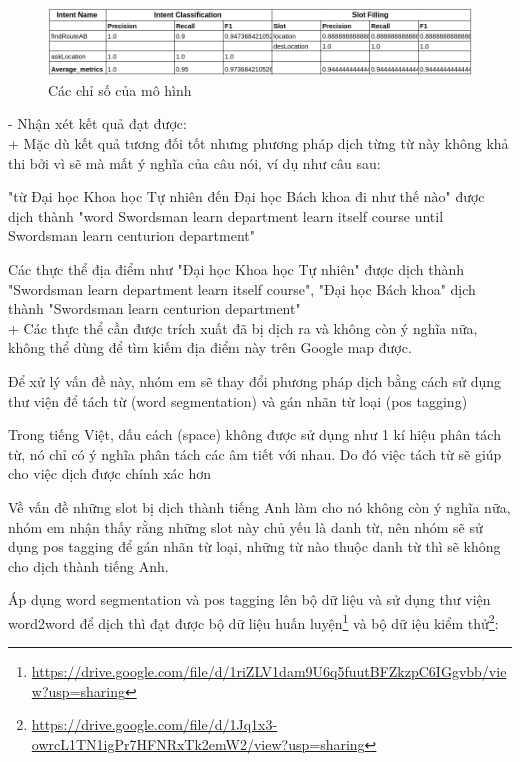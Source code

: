    \begin{figure}[htp]
              \centering
              \includegraphics[width=15cm]{images/metrics-dich-tung-t.png} 
              \caption{Các chỉ số của mô hình}
              \label{fig:sodohethongchiduong}

          \end{figure} 
          
	- Nhận xét kết quả đạt được:
	\\
	+ Mặc dù kết quả tương đối tốt nhưng phương pháp dịch từng từ này không khả thi bởi vì sẽ mà mất ý nghĩa của câu nói, ví dụ như câu sau: 

"từ Đại học Khoa học Tự nhiên đến Đại học Bách khoa đi như thế nào" được dịch thành "word Swordsman learn department learn itself course until Swordsman learn centurion department"

Các thực thể địa điểm như "Đại học Khoa học Tự nhiên" được dịch thành "Swordsman learn department learn itself course", "Đại học Bách khoa" dịch thành "Swordsman learn centurion department"
\\
	+ Các thực thể cần được trích xuất đã bị dịch ra và không còn ý nghĩa nữa, không thể dùng để tìm kiếm địa điểm này trên Google map được.

	Để xử lý vấn đề này, nhóm em sẽ thay đổi phương pháp dịch bằng cách sử dụng thư viện để tách từ (word segmentation) và gán nhãn từ loại (pos tagging)

Trong tiếng Việt, dấu cách (space) không được sử dụng như 1 kí hiệu phân tách từ, nó chỉ có ý nghĩa phân tách các âm tiết với nhau. Do đó việc tách từ sẽ giúp cho việc dịch được chính xác hơn

Về vấn đề những slot bị dịch thành tiếng Anh làm cho nó không còn ý nghĩa nữa, nhóm em nhận thấy rằng những slot này chủ yếu là danh từ, nên nhóm sẽ sử dụng pos tagging để gán nhãn từ loại, những từ nào thuộc danh từ thì sẽ không cho dịch thành tiếng Anh.

Áp dụng word segmentation và pos tagging lên bộ dữ liệu và sử dụng thư viện word2word để dịch thì đạt được bộ dữ liệu huấn luyện\footnote{\url{https://drive.google.com/file/d/1riZLV1dam9U6q5fuutBFZkzpC6IGgvbb/view?usp=sharing}} và bộ dữ iệu kiểm thử\footnote{	\url{https://drive.google.com/file/d/1Jq1x3-owrcL1TN1igPr7HFNRxTk2emW2/view?usp=sharing}
}:

